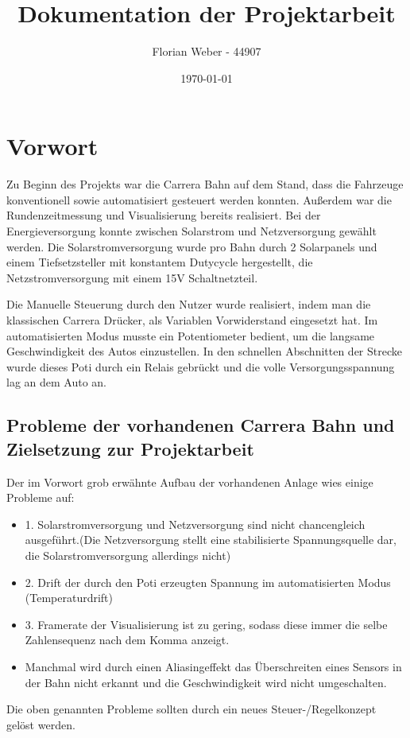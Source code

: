 \documentclass[a4paper, 11pt]{report}
\title{Dokumentation der Projektarbeit}
\author{Florian Weber - 44907}
\date{\today}
\begin{document}
\maketitle	%
\newpage

\tableofcontents 	%
\listoffigures		%
\newpage

\chapter{Vorwort}
Zu Beginn des Projekts war die Carrera Bahn auf dem Stand, dass die Fahrzeuge konventionell sowie automatisiert gesteuert werden konnten. Außerdem war die Rundenzeitmessung und Visualisierung bereits realisiert. Bei der Energieversorgung konnte zwischen Solarstrom und Netzversorgung gewählt werden.
Die Solarstromversorgung wurde pro Bahn durch 2 Solarpanels und einem Tiefsetzsteller mit konstantem Dutycycle hergestellt, die Netzstromversorgung mit einem 15V Schaltnetzteil.

Die Manuelle Steuerung durch den Nutzer wurde realisiert, indem man die klassischen Carrera Drücker, als Variablen Vorwiderstand eingesetzt hat. Im automatisierten Modus musste ein Potentiometer bedient, um die langsame Geschwindigkeit des Autos einzustellen.
In den schnellen Abschnitten der Strecke wurde dieses Poti  durch ein Relais gebrückt und die volle Versorgungsspannung lag an dem Auto an.
\section{Probleme der vorhandenen Carrera Bahn und Zielsetzung zur Projektarbeit}
Der im Vorwort grob erwähnte Aufbau der vorhandenen Anlage wies einige Probleme auf:
\begin{itemize}
	\item 1. Solarstromversorgung und Netzversorgung sind nicht chancengleich ausgeführt.(Die Netzversorgung stellt eine stabilisierte Spannungsquelle dar, die Solarstromversorgung allerdings nicht)
	\item 2. Drift der durch den Poti erzeugten Spannung im automatisierten Modus (Temperaturdrift)
	\item 3. Framerate der Visualisierung ist zu gering, sodass diese immer die selbe Zahlensequenz nach dem Komma anzeigt.
	\item Manchmal wird durch einen Aliasingeffekt das Überschreiten eines Sensors in der Bahn nicht erkannt und die Geschwindigkeit wird nicht umgeschalten.
\end{itemize}
Die oben genannten Probleme sollten durch ein neues Steuer-/Regelkonzept gelöst werden.
\newpage
\end{document}
